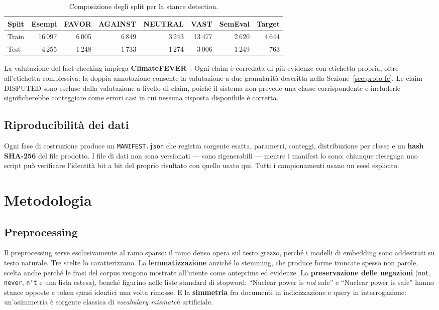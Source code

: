 \documentclass[11pt,a4paper]{report}
\begin{document}
\begin{table}[t]
\centering
\small
\begin{tabular}{lrrrrrrr}
\toprule
\textbf{Split} & \textbf{Esempi} & \textbf{FAVOR} & \textbf{AGAINST} & \textbf{NEUTRAL} &
\textbf{VAST} & \textbf{SemEval} & \textbf{Target} \\
\midrule
Train & 16\,097 & 6\,005 & 6\,849 & 3\,243 & 13\,477 & 2\,620 & 4\,644 \\
Test  & 4\,255 & 1\,248 & 1\,733 & 1\,274 & 3\,006 & 1\,249 & 763 \\
\bottomrule
\end{tabular}
\caption{Composizione degli split per la stance detection.}
\label{tab:stance-data}
\end{table}

La valutazione del fact-checking impiega \textbf{ClimateFEVER}~\cite{climatefever}. Ogni claim è
corredata di più evidenze con etichetta propria, oltre all'etichetta complessiva: la doppia
annotazione consente la valutazione a due granularità descritta nella
Sezione~\ref{sec:proto-fc}. Le claim DISPUTED sono escluse dalla valutazione a livello di claim,
poiché il sistema non prevede una classe corrispondente e includerle significherebbe conteggiare
come errori casi in cui nessuna risposta disponibile è corretta.

\section{Riproducibilità dei dati}
Ogni fase di costruzione produce un \texttt{MANIFEST.json} che registra sorgente esatta,
parametri, conteggi, distribuzione per classe e un \textbf{hash SHA-256} del file prodotto. I
file di dati non sono versionati --- sono rigenerabili --- mentre i manifest lo sono: chiunque
rieseguga uno script può verificare l'identità bit a bit del proprio risultato con quello usato
qui. Tutti i campionamenti usano un seed esplicito.

\chapter{Metodologia}\label{cap:metodo}

\section{Preprocessing}
Il preprocessing serve esclusivamente al ramo sparso: il ramo denso opera sul testo grezzo,
perché i modelli di embedding sono addestrati su testo naturale. Tre scelte lo caratterizzano.
La \textbf{lemmatizzazione} anziché lo stemming, che produce forme troncate spesso non parole,
scelta anche perché le frasi del corpus vengono mostrate all'utente come anteprime ed evidenze.
La \textbf{preservazione delle negazioni} (\texttt{not}, \texttt{never}, \texttt{n't} e una lista
estesa), benché figurino nelle liste standard di stopword: ``Nuclear power is \emph{not} safe'' e
``Nuclear power is safe'' hanno stance opposte e token quasi identici una volta rimosse. E la
\textbf{simmetria} fra documenti in indicizzazione e query in interrogazione: un'asimmetria è
sorgente classica di \emph{vocabulary mismatch} artificiale.
\end{document}
